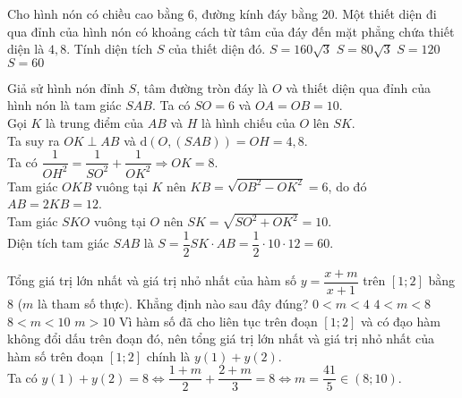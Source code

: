\begin{ex}%
Cho hình nón có chiều cao bằng $6$, đường kính đáy bằng 20. Một thiết diện đi qua đỉnh của hình nón có khoảng cách từ tâm của đáy đến mặt phẳng chứa thiết diện là $4,8$. Tính diện tích $S$ của thiết diện đó.
\choice
{$S=160\sqrt{3}$}
{$S=80\sqrt{3}$}
{$S=120$}
{\True $S=60$}
\loigiai
{
\immini
{
Giả sử hình nón đỉnh $S$, tâm đường tròn đáy là $O$ và thiết diện qua đỉnh của hình nón là tam giác $SAB$. Ta có $SO=6$ và $OA=OB=10$.\\
Gọi $K$ là trung điểm của $AB$ và $H$ là hình chiếu của $O$ lên $SK$.\\
Ta suy ra $OK\perp AB$ và $\mathrm{d}(O,(SAB))=OH=4,8$.\\
Ta có $\dfrac{1}{OH^2}=\dfrac{1}{SO^2}+\dfrac{1}{OK^2}\Rightarrow OK=8$.\\
Tam giác $OKB$ vuông tại $K$ nên $KB=\sqrt{OB^2-OK^2}=6$, do đó $AB=2KB=12$.\\
Tam giác $SKO$ vuông tại $O$ nên $SK=\sqrt{SO^2+OK^2}=10$.\\
Diện tích tam giác $SAB$ là $S=\dfrac{1}{2}SK\cdot AB=\dfrac{1}{2}\cdot 10\cdot 12=60$.
}
{
}
}
\end{ex}

\begin{ex}%
Tổng giá trị lớn nhất và giá trị nhỏ nhất của hàm số $y=\dfrac{x+m}{x+1}$ trên $[1;2]$ bằng $8$ ($m$ là tham số thực). Khẳng định nào sau đây đúng?
\choice
{$0<m<4$}
{$4<m<8$}
{\True $8<m<10$}
{$m>10$}
\loigiai
{
Vì hàm số đã cho liên tục trên đoạn $[1;2]$ và có đạo hàm không đổi dấu trên đoạn đó, nên tổng giá trị lớn nhất và giá trị nhỏ nhất của hàm số trên đoạn $[1;2]$ chính là $y(1)+y(2)$.\\
Ta có $y(1)+y(2)=8\Leftrightarrow \dfrac{1+m}{2}+\dfrac{2+m}{3}=8\Leftrightarrow m=\dfrac{41}{5}\in (8;10)$.
}
\end{ex}

